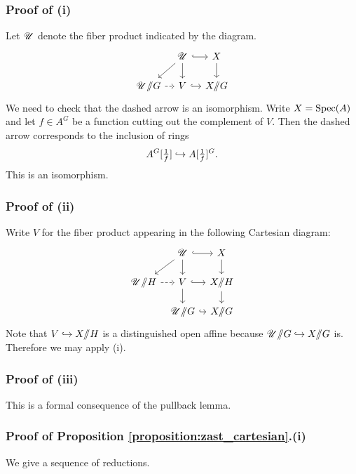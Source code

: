 \subsubsection{Proof of (i)} Let $\mathscr{U}$ denote the fiber product indicated by the diagram.
\[
\begin{tikzcd}[
  column sep={3.5em,between origins},
  row sep={3em,between origins}
]
   & \UU \arrow[dl] \arrow[d] \arrow[r, hook] & X \arrow[d] \\
  \UU \git G \arrow[r, dashed] & V \arrow[r, hook] & X \git G
\end{tikzcd}
\]
We need to check that the dashed arrow is an isomorphism. Write $X = \mathrm{Spec}(A)$ and let $f \in A^G$ be a function cutting out the complement of $V$. Then the dashed arrow corresponds to the inclusion of rings
    \[A^G[\tfrac{1}{f}] \hookrightarrow A[\tfrac{1}{f}]^G.\]
This is an isomorphism.

\subsubsection{Proof of (ii)} Write $V$ for the fiber product appearing in the following Cartesian diagram:
\[
\begin{tikzcd}[
  column sep={4em,between origins},
  row sep={3em,between origins}
]
   & \UU \arrow[dl] \arrow[d] \arrow[r, hook] & X \arrow[d] \\
  \UU \git H \arrow[r, dashed] & V \arrow[r, hook] \arrow[d] & X \git H \arrow[d] \\
   & \UU \git G \arrow[r, hook] & X \git G
\end{tikzcd}
\]
Note that $V \hookrightarrow X / \!\! / H$ is a distinguished open affine because $\mathscr{U} / \!\! / G \hookrightarrow X / \!\! / G$ is. Therefore we may apply (i).

\subsubsection{Proof of (iii)} This is a formal consequence of the pullback lemma.

\subsubsection{Proof of Proposition \ref{proposition:zast_cartesian}.(i)} We give a sequence of reductions.

